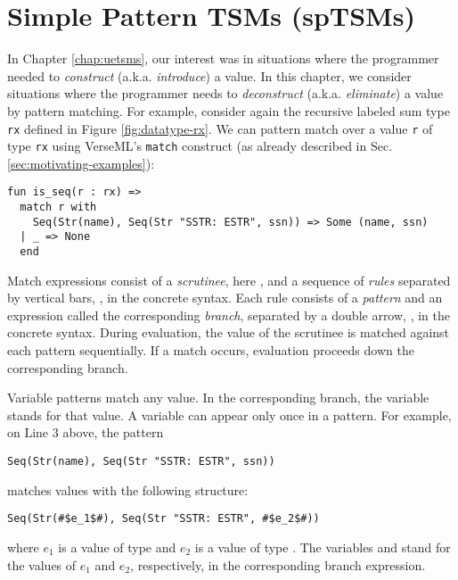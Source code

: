 \chapter{Simple Pattern TSMs (spTSMs)}\label{chap:uptsms}
In Chapter \ref{chap:uetsms}, our interest was in situations where the programmer needed to \emph{construct} (a.k.a. \emph{introduce}) a value. In this chapter, we consider situations where the programmer needs to \emph{deconstruct} (a.k.a. \emph{eliminate}) a value by pattern matching. For example, consider again the recursive labeled sum type \lstinline{rx} defined in Figure \ref{fig:datatype-rx}. We can pattern match over a value \lstinline{r} of type \lstinline{rx} using VerseML's \lstinline{match} construct (as already described in Sec. \ref{sec:motivating-examples}): 
\begin{lstlisting}
fun is_seq(r : rx) => 
  match r with 
    Seq(Str(name), Seq(Str "SSTR: ESTR", ssn)) => Some (name, ssn)
  | _ => None
  end
\end{lstlisting}

Match expressions consist of a \emph{scrutinee}, here , and a sequence of \emph{rules} separated by vertical bars, \li{|}, in the concrete syntax. Each rule consists of a \emph{pattern} and an {expression} called the corresponding \emph{branch}, separated by a double arrow, \li{=>}, in the concrete syntax. During evaluation, the value of the scrutinee is matched against each pattern sequentially. If a match occurs, evaluation proceeds down the corresponding branch. 

Variable patterns match any value. In the corresponding branch, the variable stands for that value. A variable can  appear only once in a pattern.  
For example, on Line 3 above, the pattern 
\begin{lstlisting}[numbers=none]
Seq(Str(name), Seq(Str "SSTR: ESTR", ssn))
\end{lstlisting}
matches values with the following structure: 
\begin{lstlisting}[numbers=none]
Seq(Str(#$e_1$#), Seq(Str "SSTR: ESTR", #$e_2$#))
\end{lstlisting}
where $e_1$ is a value of type  and $e_2$ is a value of type . The variables  and  stand for the values of $e_1$ and $e_2$, respectively, in the corresponding branch expression. 

